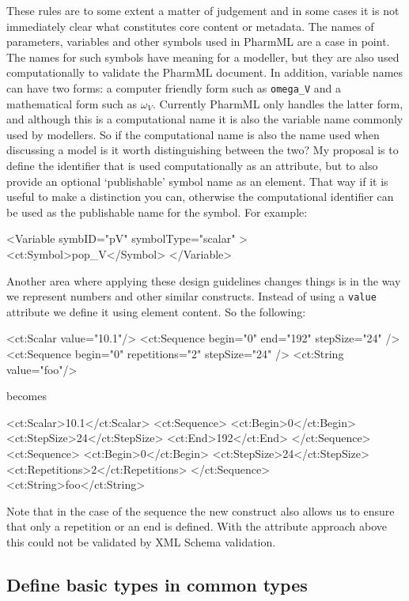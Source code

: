 \documentclass[a4paper,10pt]{article}
\newcommand{\pharmml}{PharmML\xspace}
\newcommand{\xatt}[1]{\texttt{#1}\index{XML Attribute!\texttt{#1}}}
\begin{document}
These rules are to some extent a matter of judgement and in some cases
it is not immediately clear what constitutes core content or
metadata. The names of parameters, variables and other symbols used in
\pharmml are a case in point. The names for such symbols have meaning
for a modeller, but they are also used computationally to validate the
\pharmml document. In addition, variable names can have two forms: a
computer friendly form such as \texttt{omega\_V} and a mathematical
form such as $\omega_V$. Currently \pharmml only handles the latter
form, and although this is a computational name it is also the
variable name commonly used by modellers. So if the computational name
is also the name used when discussing a model is it worth
distinguishing between the two? My proposal is to
define the identifier that is used computationally as an attribute,
but to also provide an optional `publishable' symbol name as an element. That way if
it is useful to make a distinction you can, otherwise the
computational identifier can be used as the publishable name for the
symbol. For example:
%
\begin{xmlcode}
<Variable symbID="pV" symbolType="scalar" >
  <ct:Symbol>pop_V</Symbol>
</Variable>
\end{xmlcode}

Another area where applying these design guidelines changes things is
in the way we represent numbers and other similar constructs. Instead
of using a
\xatt{value} attribute we define it using element content. So the
following:
%
\begin{xmlcode}
<ct:Scalar value="10.1"/>
<ct:Sequence begin="0" end="192" stepSize="24" />
<ct:Sequence begin="0" repetitions="2" stepSize="24" />
<ct:String value="foo"/>
\end{xmlcode}
%
becomes
%
\begin{xmlcode}
<ct:Scalar>10.1</ct:Scalar>
<ct:Sequence>
    <ct:Begin>0</ct:Begin>
    <ct:StepSize>24</ct:StepSize>
    <ct:End>192</ct:End>
</ct:Sequence>
<ct:Sequence>
    <ct:Begin>0</ct:Begin>
    <ct:StepSize>24</ct:StepSize>
    <ct:Repetitions>2</ct:Repetitions>
</ct:Sequence>
<ct:String>foo</ct:String>
\end{xmlcode}

Note that in the case of the sequence the new construct also allows us
to ensure that only a repetition or an end is defined. With the
attribute approach above this could not be validated by XML Schema
validation.


\subsection{Define basic types in common types}
\end{document}
